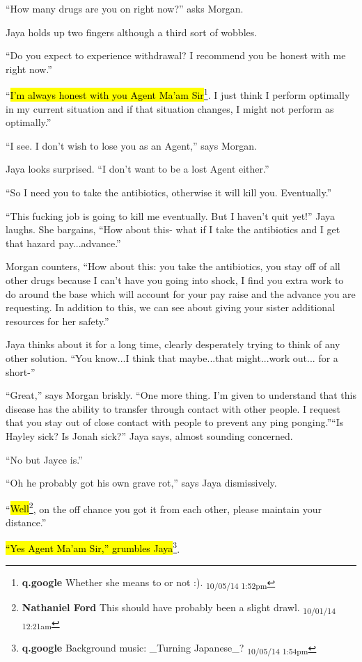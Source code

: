 ``How many drugs are you on right now?'' asks Morgan.

Jaya holds up two fingers although a third sort of wobbles.

``Do you expect to experience withdrawal?  I recommend you be honest with me right now.''

``\hl{I'm always honest with you Agent Ma'am Sir}\footnote{\textbf{q.google }Whether she means to or not :). \textsubscript{10/05/14 1:52pm}}.  I just think I perform optimally in my current situation and if that situation changes, I might not perform as optimally.''

``I see.  I don't wish to lose you as an Agent,'' says Morgan.

Jaya looks surprised.  ``I don't want to be a lost Agent either.''

``So I need you to take the antibiotics, otherwise it will kill you.  Eventually.''

``This fucking job is going to kill me eventually.  But I haven't quit yet!'' Jaya laughs.  She bargains, ``How about this- what if I take the antibiotics and I get that hazard pay...advance.''

Morgan counters, ``How about this: you take the antibiotics, you stay off of all other drugs because I can't have you going into shock, I find you extra work to do around the base which will account for your pay raise and the advance you are requesting.  In addition to this, we can see about giving your sister additional resources for her safety.''

Jaya thinks about it for a long time, clearly desperately trying to think of any other solution.  ``You know...I think that maybe...that might...work out... for a short-''

``Great,'' says Morgan briskly.  ``One more thing.  I'm given to understand that this disease has the ability to transfer through contact with other people.  I request that you stay out of close contact with people to prevent any ping ponging.''``Is Hayley sick?  Is Jonah sick?'' Jaya says, almost sounding concerned.

``No but Jayce is.''

``Oh he probably got his own grave rot,'' says Jaya dismissively.

``\hl{Well}\footnote{\textbf{Nathaniel Ford }This should have probably been a slight drawl. \textsubscript{10/01/14 12:21am}}, on the off chance you got it from each other, please maintain your distance.''

\hl{``Yes Agent Ma'am Sir,'' grumbles Jaya}\footnote{\textbf{q.google }Background music: \_Turning Japanese\_? \textsubscript{10/05/14 1:54pm}}.

